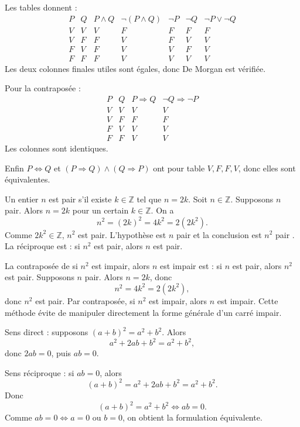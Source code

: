 \documentclass[11pt,a4paper]{article}
\newcommand{\Z}{\mathbb{Z}}
\newcommand{\non}{\neg}
\newcommand{\et}{\wedge}
\newcommand{\ou}{\vee}
\newcommand{\imp}{\Rightarrow}
\newcommand{\ssi}{\Longleftrightarrow}
\begin{document}
\begin{correctionbox}[APP 10]
Les tables donnent :
\[
\begin{array}{c|c|c|c|c|c|c}
P&Q&P\et Q&\non(P\et Q)&\non P&\non Q&\non P\ou\non Q\\
\hline
V&V&V&F&F&F&F\\
V&F&F&V&F&V&V\\
F&V&F&V&V&F&V\\
F&F&F&V&V&V&V
\end{array}
\]
Les deux colonnes finales utiles sont égales, donc De Morgan est vérifiée.

Pour la contraposée :
\[
\begin{array}{c|c|c|c}
P&Q&P\imp Q&\non Q\imp\non P\\
\hline
V&V&V&V\\
V&F&F&F\\
F&V&V&V\\
F&F&V&V
\end{array}
\]
Les colonnes sont identiques.

Enfin \(P\ssi Q\) et \((P\imp Q)\et(Q\imp P)\) ont pour table \(V,F,F,V\), donc elles sont équivalentes.
\end{correctionbox}

\begin{correctionbox}[METH 11]
Un entier \(n\) est pair s'il existe \(k\in\Z\) tel que \(n=2k\). Soit \(n\in\Z\). Supposons \(n\) pair. Alors \(n=2k\) pour un certain \(k\in\Z\). On a
\[
n^2=(2k)^2=4k^2=2(2k^2).
\]
Comme \(2k^2\in\Z\), \(n^2\) est pair. L'hypothèse est \og \(n\) pair \fg{} et la conclusion est \og \(n^2\) pair \fg{}. La réciproque est : si \(n^2\) est pair, alors \(n\) est pair.
\end{correctionbox}

\begin{correctionbox}[METH 12]
La contraposée de \og si \(n^2\) est impair, alors \(n\) est impair \fg{} est : si \(n\) est pair, alors \(n^2\) est pair. Supposons \(n\) pair. Alors \(n=2k\), donc
\[
n^2=4k^2=2(2k^2),
\]
donc \(n^2\) est pair. Par contraposée, si \(n^2\) est impair, alors \(n\) est impair. Cette méthode évite de manipuler directement la forme générale d'un carré impair.
\end{correctionbox}

\begin{correctionbox}[METH 13]
Sens direct : supposons \((a+b)^2=a^2+b^2\). Alors
\[
a^2+2ab+b^2=a^2+b^2,
\]
donc \(2ab=0\), puis \(ab=0\).

Sens réciproque : si \(ab=0\), alors
\[
(a+b)^2=a^2+2ab+b^2=a^2+b^2.
\]
Donc
\[
(a+b)^2=a^2+b^2\ssi ab=0.
\]
Comme \(ab=0\ssi a=0\) ou \(b=0\), on obtient la formulation équivalente.
\end{correctionbox}
\end{document}
